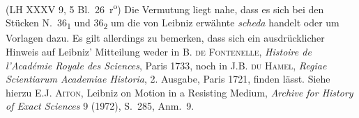 (LH XXXV 9, 5 Bl.~26~r\textsuperscript{o})
Die Vermutung liegt nahe, dass es sich bei den St\"{u}cken N.~36\textsubscript{1} und 36\textsubscript{2} um die von Leibniz erwähnte \textit{scheda} handelt oder um Vorlagen dazu.
Es gilt allerdings zu bemerken,
dass sich ein ausdrücklicher Hinweis auf Leibniz' Mitteilung
weder in \cite{00295}\textsc{B. de Fontenelle}, \textit{Histoire de l'Académie Royale des Sciences}, Paris 1733,
noch in \cite{01027}\textsc{J.B. du Hamel}, \textit{Regiae Scientiarum Academiae Historia}, 2. Ausgabe, Paris 1721,
finden lässt.
Siehe hierzu \cite{01028}\textsc{E.J. Aiton}, \glqq Leibniz on Motion in a Resisting Medium\grqq, \textit{Archive for History of Exact Sciences} 9 (1972), S.~285, Anm.~9.
\pend
\newpage
\normalsize